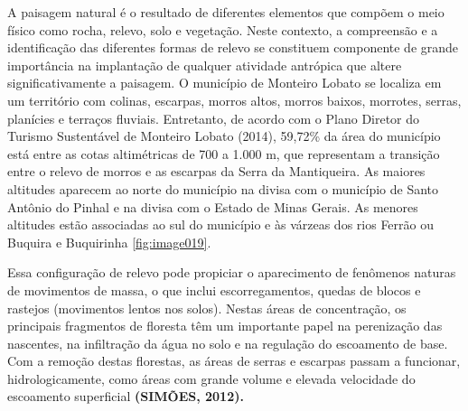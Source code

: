 A paisagem natural é o resultado de diferentes elementos que compõem o meio físico como rocha, relevo, solo e vegetação. Neste contexto, a compreensão e a identificação das diferentes formas de relevo se constituem componente de grande importância na implantação de qualquer atividade antrópica que altere significativamente a paisagem. O município de Monteiro Lobato se localiza em um território com colinas, escarpas, morros altos, morros baixos, morrotes, serras, planícies e terraços fluviais. Entretanto, de acordo com o Plano Diretor do Turismo Sustentável de Monteiro Lobato (2014), 59,72\% da área do município está entre as cotas altimétricas de 700 a 1.000 m, que representam a transição entre o relevo de morros e as escarpas da Serra da Mantiqueira. As maiores altitudes aparecem ao norte do município na divisa com o município de Santo Antônio do Pinhal e na divisa com o Estado de Minas Gerais. As menores altitudes estão associadas ao sul do município e às várzeas dos rios Ferrão ou Buquira e Buquirinha \autoref{fig:image019}. 

Essa configuração de relevo pode propiciar o aparecimento de fenômenos naturas de movimentos de massa, o que inclui escorregamentos, quedas de blocos e rastejos (movimentos lentos nos solos). Nestas áreas de concentração, os principais fragmentos de floresta têm um importante papel na perenização das nascentes, na infiltração da água no solo e na regulação do escoamento de base. Com a remoção destas florestas, as áreas de serras e escarpas passam a funcionar, hidrologicamente, como áreas com grande volume e elevada velocidade do escoamento superficial \textbf{(SIMÕES, 2012).}

